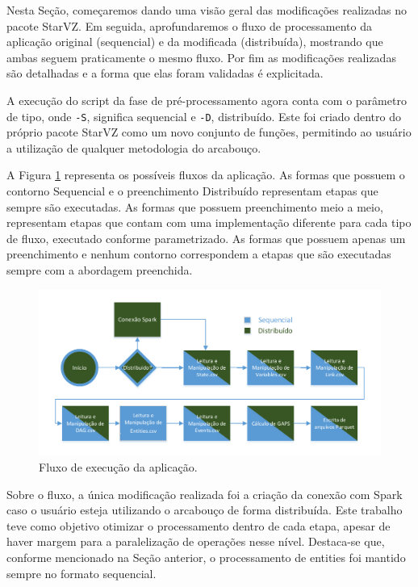 Nesta Seção, começaremos dando uma visão geral das modificações realizadas no 
pacote StarVZ. Em seguida, aprofundaremos o fluxo de processamento da aplicação 
original (sequencial) e da modificada (distribuída), mostrando que ambas seguem 
praticamente o mesmo fluxo. Por fim as modificações realizadas são detalhadas e 
a forma que elas foram validadas é explicitada.

A execução do script da fase de pré-processamento agora conta com o parâmetro de 
tipo, onde \texttt{-S}, significa sequencial e \texttt{-D}, distribuído. Este 
foi criado dentro do próprio pacote StarVZ como um novo conjunto de funções, 
permitindo ao usuário a utilização de qualquer metodologia do arcabouço.

A Figura \ref{fig:spark-starvz-flow} representa os possíveis fluxos da 
aplicação.  As formas que possuem o contorno Sequencial e o preenchimento 
Distribuído representam etapas que sempre são executadas. As formas que possuem 
preenchimento meio a meio, representam etapas que contam com uma implementação 
diferente para cada tipo de fluxo, executado conforme parametrizado. As formas 
que possuem apenas um preenchimento e nenhum contorno correspondem a etapas que 
são executadas sempre com a abordagem preenchida.

\begin{figure}[H]
 \centerline{\includegraphics[width=1\textwidth]{./img/applicationflow.pdf}}
 \caption{Fluxo de execução da aplicação.}
 \label{fig:spark-starvz-flow}
\end{figure}

Sobre o fluxo, a única modificação realizada foi a criação da conexão com Spark 
caso o usuário esteja utilizando o arcabouço de forma distribuída. Este 
trabalho teve como objetivo otimizar o processamento dentro de cada 
etapa, apesar de haver margem para a paralelização de operações nesse nível. 
Destaca-se que, conforme mencionado na Seção anterior, o processamento de 
entities foi mantido sempre no formato sequencial.

